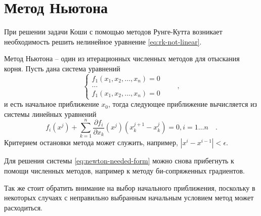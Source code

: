 \section{Метод Ньютона}
При решении задачи Коши с помощью методов Рунге-Кутта возникает необходимость
решить нелинейное уравнение \ref{eq:rk-not-linear}.

Метод Ньютона -- один из итерационных численных методов для отыскания корня.
Пусть дана система уравнений
\begin{equation}\label{eq:newton-needed-form}
    \begin{cases}
        f_1(x_1, x_2,\dots, x_n) = 0\\
        \dots\\
        f_1(x_1, x_2,\dots, x_n) = 0
    \end{cases} \qquad ,
\end{equation}
и есть начальное приближение $x_{0}$, тогда следующее приближение вычисляется
из системы линейных уравнений
\begin{equation}\label{eq:newton-generalized-iteration}
    f_i(x^j) + \sum_{k=1}^n \frac{\partial f_i}{\partial x_k}(x^j)
    (x_k^{j+1}-x_k^{j}) = 0,  i=1\dots n \quad .
\end{equation}
Критерием остановки метода может служить, например, $|x^i - x^{i-1}|<\epsilon$.

Для решения системы \ref{eq:newton-needed-form} можно снова прибегнуть к помощи
численных методов, например к методу би-сопряженных градиентов.

Так же стоит обратить внимание на выбор начального приближения, поскольку в
некоторых случаях с неправильно выбранным начальным условием метод может
расходиться.
